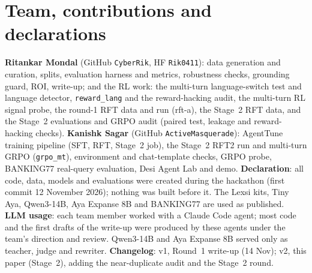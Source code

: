\documentclass[11pt]{article}
\newcommand{\tool}[1]{\texttt{\small #1}}
\begin{document}
\section{Team, contributions and declarations}

\textbf{Ritankar Mondal} (GitHub \texttt{CyberRik}, HF \texttt{Rik0411}): data generation and curation, splits,
evaluation harness and metrics, robustness checks, grounding guard, ROI, write-up; and the RL work: the multi-turn
language-switch test and language detector, \tool{reward\_lang} and the reward-hacking audit, the multi-turn RL
signal probe, the round-1 RFT data and run (rft-a), the Stage~2 RFT data, and the Stage~2 evaluations and GRPO
audit (paired test, leakage and reward-hacking checks).
\textbf{Kanishk Sagar} (GitHub \texttt{ActiveMasquerade}): AgentTune training pipeline (SFT, RFT, Stage~2 job),
the Stage~2 RFT2 run and multi-turn GRPO (\tool{grpo\_mt}),
environment and chat-template checks, GRPO probe, BANKING77 real-query evaluation, Desi Agent Lab and demo.
\textbf{Declaration}: all code, data, models and evaluations were created during the hackathon (first commit
12 November 2026); nothing was built before it. The Lexsi kits, Tiny Aya, Qwen3-14B, Aya Expanse 8B and BANKING77 are
used as published.
\textbf{LLM usage}: each team member worked with a Claude Code agent; most code and the first drafts of the
write-up were produced by these agents under the team's direction and review. Qwen3-14B and Aya Expanse 8B served
only as teacher, judge and rewriter.
\textbf{Changelog}: v1, Round~1 write-up (14 Nov); v2, this paper (Stage~2), adding the near-duplicate audit and the
Stage~2 round.
\end{document}
